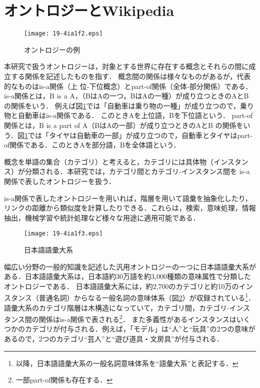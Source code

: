 \documentclass[japanese]{jnlp_1.4}
\begin{document}
\section{オントロジーとWikipedia}
\label{sec:onto_wiki}

\begin{figure}[b]
\begin{center}
\texttt{[image: 19-4ia1f2.eps]}
\end{center}
\caption{オントロジーの例}
\label{fig:onto_toha}
\end{figure}

本研究で扱うオントロジーは，対象とする世界に存在する概念とそれらの間に成立する関係を記述したものを指す．
概念間の関係は様々なものがあるが，代表的なものはis-a関係（上\linebreak
位‐下位概念）とpart-of関係（全体‐部分関係）である．
is-a関係とは，B is a A，（BはAの一つ，BはAの一種）が成り立つときのAとB の関係をいう．
例えば図\ref{fig:onto_toha}では「自動車は乗り物の一種」が成り立つので，乗り物と自動車はis-a関係である．
このときAを上位語，Bを下位語という．
part-of関係とは，B is a part of A（BはAの一部）が成り立つときのAとB の関係をいう．図\ref{fig:onto_toha}では「タイヤは自動車の一部」が成り立つので，自動車とタイヤはpart-of関係である．このときAを部分語，Bを全体語という．

概念を単語の集合（カテゴリ）と考えると，カテゴリには具体物（インスタンス）が分類される．本研究では，カテゴリ間とカテゴリ‐インスタンス間を
is-a関係で表したオントロジーを扱う．

is-a関係で表したオントロジーを用いれば，階層を用いて語彙を抽象化したり，リンクの距離から類似度を計算したりできる．これらは，検索，意味処理，情報抽出，機械学習や統計処理など様々な用途に適用可能である．

\begin{figure}[b]
\begin{center}
\texttt{[image: 19-4ia1f3.eps]}
\end{center}
\caption{日本語語彙大系}
\label{fig:goitaikei}
\end{figure}

幅広い分野の一般的知識を記述した汎用オントロジーの一つに日本語語彙大系\cite{goitaikei}がある．日本語語彙大系は，日本語約30万語を約3,000種類の意味属性で分類した
オントロジーである．
日本語語彙大系には，約2,700のカテゴリと約10万のインスタンス（普通名詞）からなる一般名詞の意味体系（図\ref{fig:goitaikei}）が収録されている\footnote{以降，日本語語彙大系の一般名詞意味体系を``語彙大系''と表記する．}．
語彙大系のカテゴリ階層は木構造になっていて，カテゴリ間，カテゴリ‐インスタンス間の関係はis-a関係で表される\footnote{一部part-of関係も存在する．}．
また多義性があるインスタンスはいくつかのカテゴリが付与される．例えば，「モデル」は``人''と``玩具''の2つの意味があるので，2つのカテゴリ``芸人''と``遊び道具・文房具''が付与される．
\end{document}
